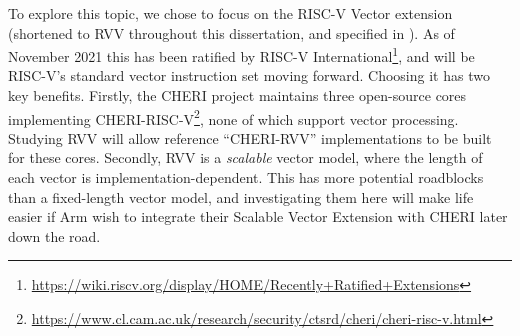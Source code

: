 To explore this topic, we chose to focus on the RISC-V Vector extension (shortened to RVV throughout this dissertation, and specified in \cite{specification-RVV-v1.0}).
As of November 2021 this has been ratified by RISC-V International\footnote{\url{https://wiki.riscv.org/display/HOME/Recently+Ratified+Extensions}}, and will be RISC-V's standard vector instruction set moving forward.
Choosing it has two key benefits.
Firstly, the CHERI project maintains three open-source cores implementing CHERI-RISC-V\footnote{\url{https://www.cl.cam.ac.uk/research/security/ctsrd/cheri/cheri-risc-v.html}}, none of which support vector processing.
Studying RVV will allow reference \enquote{CHERI-RVV} implementations to be built for these cores.
Secondly, RVV is a \emph{scalable} vector model, where the length of each vector is implementation-dependent.
This has more potential roadblocks than a fixed-length vector model, and investigating them here will make life easier if Arm wish to integrate their Scalable Vector Extension with CHERI later down the road.



